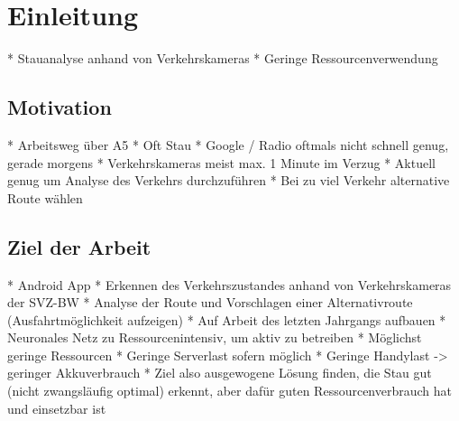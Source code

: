 \chapter{Einleitung}
\label{cha:Einleitung}
* Stauanalyse anhand von Verkehrskameras\newline
* Geringe Ressourcenverwendung\newline

\section{Motivation}
\label{sec:Motivation}
* Arbeitsweg über A5\newline
* Oft Stau\newline
* Google / Radio oftmals nicht schnell genug, gerade morgens\newline
* Verkehrskameras meist max. 1 Minute im Verzug\newline
* Aktuell genug um Analyse des Verkehrs durchzuführen\newline
* Bei zu viel Verkehr alternative Route wählen\newline

\section{Ziel der Arbeit}
\label{sec:ZielDerArbeit}
* Android App\newline
* Erkennen des Verkehrszustandes anhand von Verkehrskameras der SVZ-BW\newline
* Analyse der Route und Vorschlagen einer Alternativroute (Ausfahrtmöglichkeit aufzeigen)\newline
* Auf Arbeit des letzten Jahrgangs aufbauen\newline
* Neuronales Netz zu Ressourcenintensiv, um aktiv zu betreiben\newline
* Möglichst geringe Ressourcen\newline
* Geringe Serverlast sofern möglich\newline
* Geringe Handylast -> geringer Akkuverbrauch\newline
* Ziel also ausgewogene Lösung finden, die Stau gut (nicht zwangsläufig optimal) erkennt, aber dafür guten\newline
	Ressourcenverbrauch hat und einsetzbar ist